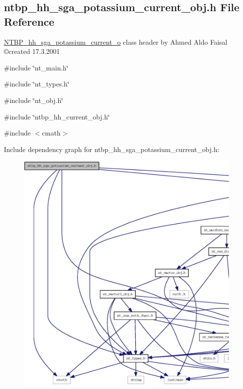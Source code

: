 \subsection{ntbp\_\-hh\_\-sga\_\-potassium\_\-current\_\-obj.h File Reference}
\label{ntbp__hh__sga__potassium__current__obj_8h}



\begin{DoxyItemize}
\item \hyperlink{class_n_t_b_p__hh__sga__potassium__current__o}{NTBP\_\-hh\_\-sga\_\-potassium\_\-current\_\-o} class header by Ahmed Aldo Faisal \copyright created 17.3.2001 
\end{DoxyItemize} 


{\ttfamily \#include \char`\"{}nt\_\-main.h\char`\"{}}\par
{\ttfamily \#include \char`\"{}nt\_\-types.h\char`\"{}}\par
{\ttfamily \#include \char`\"{}nt\_\-obj.h\char`\"{}}\par
{\ttfamily \#include \char`\"{}ntbp\_\-hh\_\-current\_\-obj.h\char`\"{}}\par
{\ttfamily \#include $<$cmath$>$}\par
Include dependency graph for ntbp\_\-hh\_\-sga\_\-potassium\_\-current\_\-obj.h:
\nopagebreak
\begin{figure}[H]
\begin{center}
\leavevmode
\includegraphics[width=400pt]{ntbp__hh__sga__potassium__current__obj_8h__incl}
\end{center}
\end{figure}
